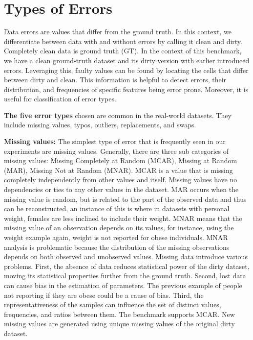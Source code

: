 \section{Types of Errors}
\label{sec:error_types}

Data errors are values that differ from the ground truth.
In this context, we differentiate between data with and without errors by calling it clean and dirty. 
Completely clean data is ground truth (GT).  
In the context of this benchmark, we have a clean ground-truth dataset and its dirty version with earlier introduced errors.  
Leveraging this, faulty values can be found by locating the cells that differ between dirty and clean. 
This information is helpful to detect errors, their distribution, and frequencies of specific features being error prone.  
Moreover, it is useful for classification of error types.

\textbf{The five error types} chosen are common in the real-world datasets. They include missing values, typos, outliers, replacements, and swaps. 

\textbf{Missing values:} 
The simplest type of error that is frequently seen in our experiments are missing values. 
Generally, there are three sub categories of missing values: 
Missing Completely at Random (MCAR), Missing at Random (MAR), Missing Not at Random (MNAR). 
MCAR is a value that is missing completely independently from other values and itself. 
Missing values have no dependencies or ties to any other values in the dataset. 
MAR occurs when the missing value is random, but is related to the part of the observed data and thus can be reconstructed, an instance of this is where in datasets with personal weight, females are less inclined to include their weight. 
MNAR means that the missing value of an observation depends on its values, for instance, using the weight example again, weight is not reported for obese individuals.
MNAR analysis is problematic because the distribution of the missing observations depends on both observed and unobserved values.
Missing data introduce various problems. 
First, the absence of data reduces statistical power of the dirty dataset, moving its statistical properties further from the ground truth.
Second, lost data can cause bias in the estimation of parameters. 
The previous example of people not reporting if they are obese could be a cause of bias. 
Third, the representativeness of the samples can influence the set of distinct values, frequencies, and ratios between them.
The benchmark supports MCAR. 
New missing values are generated using unique missing values of the original dirty dataset. 

